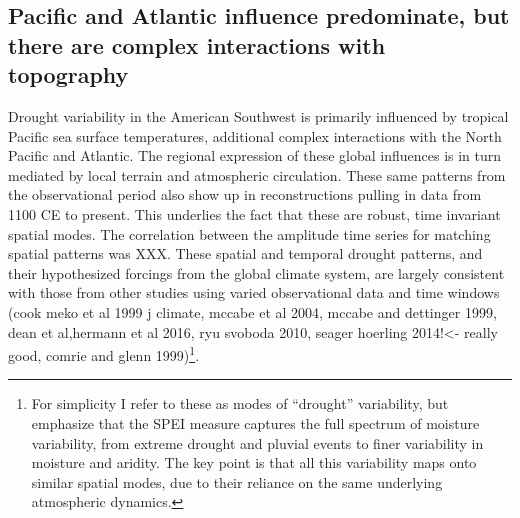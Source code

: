 \documentclass[fleqn,10pt]{wlscirep}
\begin{document}
\subsection*{Pacific and Atlantic influence predominate, but there are complex interactions with topography}

Drought variability in the American Southwest is primarily influenced by tropical Pacific sea surface temperatures, additional complex interactions with the North Pacific and Atlantic. The regional expression of these global influences is in turn mediated by local terrain and atmospheric circulation. These same patterns from the observational period also show up in reconstructions pulling in data from 1100 CE to present. This underlies the fact that these are robust, time invariant spatial modes. The correlation between the amplitude time series for matching spatial patterns was XXX. These spatial and temporal drought patterns, and their hypothesized forcings from the global climate system, are largely consistent with those from other studies using varied observational data and time windows (cook meko et al 1999 j climate, mccabe et al 2004, mccabe and dettinger 1999, dean et al,hermann et al 2016, ryu svoboda 2010, seager hoerling 2014!<- really good, comrie and glenn 1999)\footnote{For simplicity I refer to these as modes of ``drought'' variability, but emphasize that the SPEI measure captures the full spectrum of moisture variability, from extreme drought and pluvial events to finer variability in moisture and aridity. The key point is that all this variability maps onto similar spatial modes, due to their reliance on the same underlying atmospheric dynamics.}.
\end{document}
